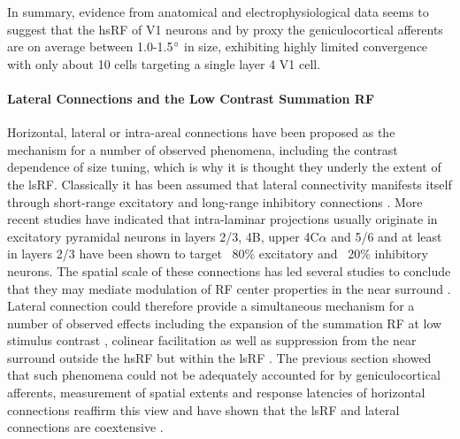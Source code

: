 In summary, evidence from anatomical and electrophysiological data
seems to suggest that the hsRF of V1 neurons and by proxy the
geniculocortical afferents are on average between 1.0-1.5$\degree$ in
size, exhibiting highly limited convergence with only about 10 cells
targeting a single layer 4 V1 cell.

\paragraph{Lateral Connections and the Low Contrast Summation RF}

Horizontal, lateral or intra-areal connections have been proposed as
the mechanism for a number of observed phenomena, including the
contrast dependence of size tuning, which is why it is thought they
underly the extent of the lsRF. Classically it has been assumed that
lateral connectivity manifests itself through short-range excitatory
and long-range inhibitory connections
\citep{VonderMalsburg1973,Obermayer1990b}. More recent studies have
indicated that intra-laminar projections usually originate in
excitatory pyramidal neurons in layers 2/3, 4B, upper 4C$\alpha$ and
5/6 and at least in layers 2/3 have been shown to target ~80\%
excitatory and ~20\% inhibitory neurons. The spatial scale of these
connections has led several studies to conclude that they may mediate
modulation of RF center properties in the near surround
\citep{Angelucci2002}. Lateral connection could therefore provide a
simultaneous mechanism for a number of observed effects including the
expansion of the summation RF at low stimulus contrast
\citep{Sceniak1999}, colinear facilitation \citep{Mizobe2001} as well
as suppression from the near surround outside the hsRF but within the
lsRF \citep{Sceniak2001,Levitt2002}. The previous section showed that
such phenomena could not be adequately accounted for by
geniculocortical afferents, measurement of spatial extents and
response latencies of horizontal connections reaffirm this view and
have shown that the lsRF and lateral connections are coextensive
\citep{Angelucci2002}.

